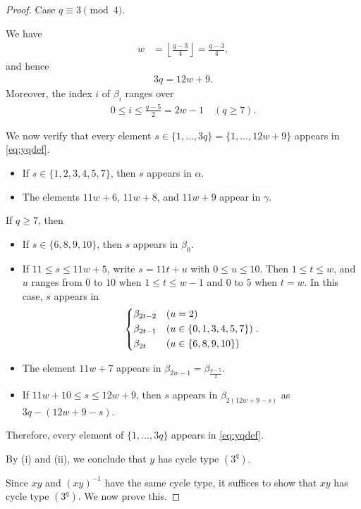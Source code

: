 \documentclass[12pt,reqno]{amsart}
\newcommand{\A}{\alpha}									%
\newcommand{\B}{\beta}									%
\newcommand{\G}{\gamma}								%
\newcommand{\HL}{\vspace{2mm}}							%
\newcommand{\q}{\quad}									%
\newcommand{\f}[2]{\frac{#1}{#2}}							%
\newcommand{\fl}[1]{\left\lfloor #1 \right\rfloor}					%
\theoremstyle{mythmstyle}
\theoremstyle{mydefstyle}
\numberwithin{equation}{section}
\begin{document}
\begin{proof}
\item[(ii)] Case $q \equiv 3 \pmod{4}$.

We have
\begin{align}
w &=  \fl{\f{q-3}{4}} = \f{q-3}{4},
\end{align}
and hence
\begin{align}
3q = 12w+9.
\end{align}
Moreover, the index $i$ of $\B_{i}$ ranges over
\begin{align}
0 \le i \le \f{q-5}{2} =  2w-1 \q (q \ge 7).
\end{align}

We now verify that every element $s \in \{1, \ldots, 3q\} = \{1, \ldots, 12w+9\}$ appears in \eqref{eq:yqdef}.
\begin{itemize}
\item If $s \in \{ 1, 2, 3, 4, 5, 7 \}$, then $s$ appears in $\A$.
\item The elements $11w+6$, $11w+8$, and $11w+9$ appear in $\G$.
\end{itemize}
If $q \ge 7$, then
\begin{itemize}
\item If $s \in \{ 6, 8, 9, 10 \}$, then $s$ appears in $\B_{0}$.
\item If $11 \le s \le 11w+5$, write $s = 11t+u$ with $0 \le u \le 10$. Then $1 \le t \le w$,
and $u$ ranges from $0$ to $10$ when $1 \le t \le w-1$ and $0$ to $5$ when $t = w$.
In this case, $s$ appears in
\begin{align}
\begin{dcases}
\B_{2t-2} & (u = 2) \\
\B_{2t-1} & (u \in \{ 0, 1, 3, 4, 5, 7 \}) \\
\B_{2t} & (u \in \{ 6, 8, 9, 10 \})
\end{dcases}.
\end{align}
\item The element $11w+7$ appears in $\B_{2w-1} = \B_{\f{q-5}{2}}$.
\item If $11w+10 \le s \le 12w+9$, then $s$ appears in $\B_{2(12w+9-s)}$ as $3q-(12w+9-s)$.
\end{itemize}
Therefore, every element of $\{ 1, \ldots, 3q \}$ appears in  \eqref{eq:yqdef}.
\HL

By (i) and (ii), we conclude that $y$ has cycle type $(3^{q})$.
\HL

\item[\ref{itm:c3b3-2}]
Since $xy$ and $(xy)^{-1}$ have the same cycle type, it suffices to show that $xy$ has cycle type $(3^q)$.
We now prove this.


\end{proof}
\end{document}
